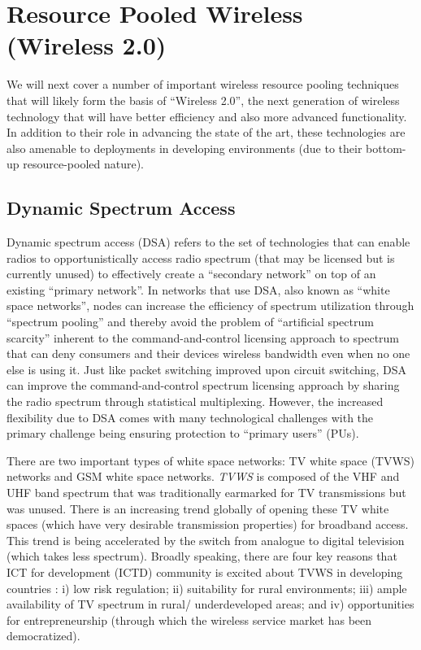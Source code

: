 \documentclass{sigcomm-alternate}
\begin{document}
\section{Resource Pooled Wireless \\(Wireless 2.0)} 
\label{sec:rpWireless}



We will next cover a number of important wireless resource pooling 
techniques that will likely form the basis of ``Wireless 2.0'', the next generation of wireless technology that will have better efficiency and also more advanced functionality. In addition to their role in advancing the state of the art, these technologies are also amenable to deployments in developing environments (due to their bottom-up resource-pooled nature). 

\subsection{Dynamic Spectrum Access}
\label{dsa}

Dynamic spectrum access (DSA) refers to the set of technologies that can enable radios to opportunistically access radio spectrum (that may be licensed but is currently unused) to effectively create a ``secondary network'' on top of an existing ``primary network''. In networks that use DSA, also known as ``white space networks'', nodes can increase the efficiency of spectrum utilization through ``spectrum pooling'' \cite{weiss2004spectrum} and thereby avoid the problem of ``artificial spectrum scarcity'' inherent to the command-and-control licensing approach to spectrum that can deny consumers and their devices wireless bandwidth even when no one else is using it. Just like packet switching improved upon circuit switching, DSA can improve the command-and-control spectrum licensing approach by sharing the radio spectrum through statistical multiplexing. However, the increased flexibility due to DSA comes with many technological challenges with the primary challenge being ensuring protection to ``primary users'' (PUs). 





There are two important types of white space networks: TV white space (TVWS) networks and GSM white space networks. \textit{TVWS} is composed of the VHF and UHF band spectrum that was traditionally earmarked for TV transmissions but was unused. There is an increasing trend globally of opening these TV white spaces (which have very desirable transmission properties) for broadband access. This trend is being accelerated by the switch from analogue to digital television (which takes less spectrum). Broadly speaking, there are four key reasons that ICT for development (ICTD) community is excited about TVWS in developing countries \cite{Zennaro2013tvws}: i) low risk regulation; ii) suitability for rural environments; iii) ample availability of TV spectrum in rural/ underdeveloped areas; and iv) opportunities for entrepreneurship (through which the wireless service market has been democratized).  
\end{document}
